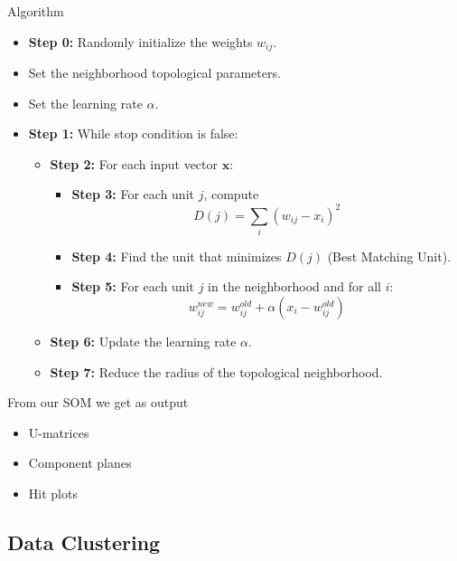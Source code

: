 \vspace{10pt}

Algorithm

\begin{itemize}
    \item \textbf{Step 0:} Randomly initialize the weights $w_{ij}$.
    \item Set the neighborhood topological parameters.
    \item Set the learning rate $\alpha$.

    \item \textbf{Step 1:} While stop condition is false:
    \begin{itemize}
        \item \textbf{Step 2:} For each input vector $\mathbf{x}$:
        \begin{itemize}
            \item \textbf{Step 3:} For each unit $j$, compute  
            \[
                D(j) = \sum_i (w_{ij} - x_i)^2
            \]
            \item \textbf{Step 4:} Find the unit that minimizes $D(j)$ (Best Matching Unit).
            \item \textbf{Step 5:} For each unit $j$ in the neighborhood and for all $i$:
            \[
                w_{ij}^{new} = w_{ij}^{old} + \alpha \left(x_i - w_{ij}^{old}\right)
            \]
        \end{itemize}

        \item \textbf{Step 6:} Update the learning rate $\alpha$.
        \item \textbf{Step 7:} Reduce the radius of the topological neighborhood.
    \end{itemize}
\end{itemize}


\vspace{10pt}

From our SOM we get as output

\begin{itemize}
    \item U-matrices
    \item Component planes
    \item Hit plots
\end{itemize}

\subsection{Data Clustering}


